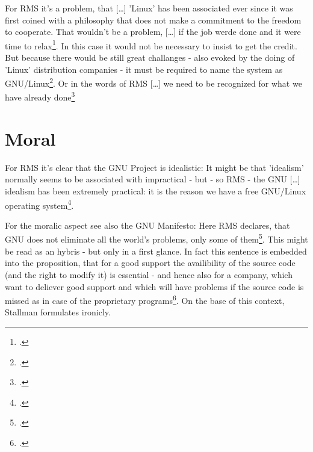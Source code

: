 \documentclass[DIV=calc,BCOR=5mm,11pt,headings=small,oneside,abstract=true, toc=bib]{scrartcl}
\begin{document}
For RMS it's a problem, that \glqq{}[\ldots] 'Linux' has been associated
ever since it was first coined with a philosophy that does not make a
commitment to the freedom to cooperate\grqq{}.
That wouldn't be a problem, \glqq{}[\ldots]
if the job werde done and it were time
to relax\grqq{}\footcite[cf][51]{Stallman2000a}. In this case it would not be
necessary to insist to get the credit. But because there would be still
\glqq{}great challanges\grqq{} - also evoked by the doing of
\glqq{}'Linux' distribution companies\grqq{} - it must be required to name the
system as \glqq{}GNU/Linux\grqq{}\footcite[cf][51]{Stallman2000a}. Or in the
words of RMS \glqq{}[\ldots] we need to be recognized for what we have
already done\grqq{}\footcite[cf][53]{Stallman2000a}

\section{Moral}

For RMS it's clear that \glqq{}the GNU Project is idealistic\grqq{}: It might be
that 'idealism' normally seems to be associated with \glqq{}impractical\grqq{} -
but - so RMS - the GNU \glqq{}[\ldots] idealism has been extremely
practical: it is the reason we have a free GNU/Linux operating
system\grqq{}\footcite[cf][53]{Stallman2000a}.

For the moralic aspect see also the GNU Manifesto: Here RMS declares, that
\glqq{}GNU does not eliminate all the world's problems, only some of
them\grqq{}\footcite[cf][35]{Stallman1984a}. This might be read as an hybris -
but only in a first glance. In fact this sentence is embedded into the
proposition, that for a good support the availibility of the source code
(and the right to modify it) is essential - and hence also for a company, which
want to deliever good support and which will have problems if the source code is
missed as in case of the proprietary programs\footcite[cf][35]{Stallman1984a}.
On the base of this context, Stallman formulates ironicly.

\small

\end{document}
